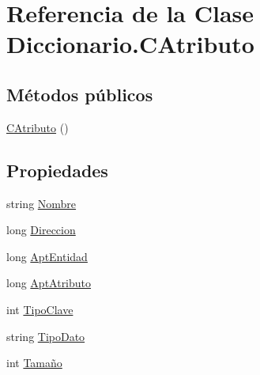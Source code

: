 \hypertarget{class_diccionario_1_1_c_atributo}{\section{Referencia de la Clase Diccionario.\-C\-Atributo}
\label{class_diccionario_1_1_c_atributo}
}
\subsection*{Métodos públicos}
\begin{DoxyCompactItemize}
\item 
\hyperlink{class_diccionario_1_1_c_atributo_a57d7d9f4dec1edd7517e352f55a939ef}{C\-Atributo} ()
\end{DoxyCompactItemize}
\subsection*{Propiedades}
\begin{DoxyCompactItemize}
\item 
string \hyperlink{class_diccionario_1_1_c_atributo_a9396c322b003bc2c56d858b0648e2774}{Nombre}
\item 
long \hyperlink{class_diccionario_1_1_c_atributo_ab616a2869cb76ee8abc66dc53632fbe9}{Direccion}
\item 
long \hyperlink{class_diccionario_1_1_c_atributo_a1dc471eb80539c59c99e97ccdf3dd5ee}{Apt\-Entidad}
\item 
long \hyperlink{class_diccionario_1_1_c_atributo_a2b7b3ff37eb365f1b9feb1dc401e754e}{Apt\-Atributo}
\item 
int \hyperlink{class_diccionario_1_1_c_atributo_a1d301261d656f02e8c8c5787b3eb0004}{Tipo\-Clave}
\item 
string \hyperlink{class_diccionario_1_1_c_atributo_a6287a1296fc232ada4583479ab0d0f9a}{Tipo\-Dato}
\item 
int \hyperlink{class_diccionario_1_1_c_atributo_a6c70b441c915fd46239f089e98320361}{Tamaño}
\end{DoxyCompactItemize}


